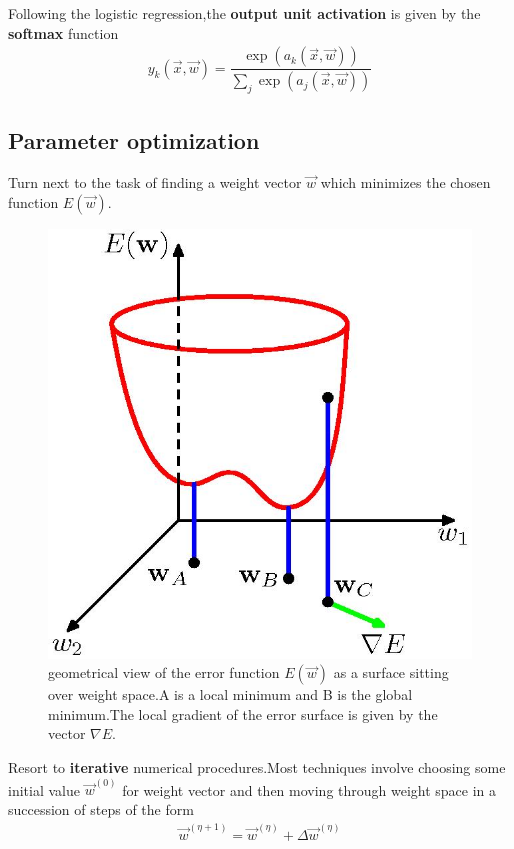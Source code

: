 Following the logistic regression,the \textbf{output unit activation} is given by the \textbf{softmax} function
\begin{align}
y_k(\vec{x},\vec{w})=\dfrac{\exp(a_k(\vec{x},\vec{w}))}{\sum_j\exp(a_j(\vec{x},\vec{w})) }
\end{align}

\subsection{Parameter optimization}
Turn next to the task of finding a weight vector $\vec{w}$ which minimizes the chosen function $E(\vec{w})$.
\begin{figure}
	\includegraphics{figures/prml/Figure5.5.jpg}
	\caption{geometrical view of the error function $E(\vec{w})$ as a surface sitting over weight space.A is a local minimum and B is the global minimum.The local gradient of the error surface is given by the vector $\nabla E$.}
\end{figure}
Resort to \textbf{iterative} numerical procedures.Most techniques involve choosing some initial value $\vec{w}^{(0)}$ for weight vector and then moving through weight space in a succession of steps of the form
\begin{align}
\vec{w}^{(\eta+1)}=\vec{w}^{(\eta)}+\Delta \vec{w}^{(\eta)}
\end{align}

